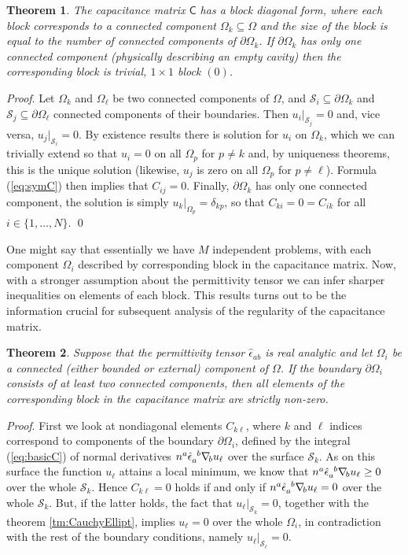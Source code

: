 \documentclass[12pt]{iopart}
\newcommand{\dd}{\partial}
\newcommand{\nab}[1]{\nabla_{\! #1}}
\newcommand{\mx}[1]{\bm{\mathsf{#1}}}
\newcommand{\0}{\vct{0}}
\theoremstyle{plain} \newtheorem{tm}{Theorem}[section]
\theoremstyle{plain} \newtheorem{lm}[tm]{Lemma}
\theoremstyle{definition} \newtheorem{defn}[tm]{Definition}
\newcommand{\btm}{\begin{tm}}
\newcommand{\etm}{\end{tm}}
\begin{document}
\btm
The capacitance matrix $\mx{C}$ has a block diagonal form, where each block corresponds to a connected component $\Omega_k \subseteq \Omega$ and the size of the block is equal to the number of connected components of $\dd\Omega_k$. If $\dd\Omega_k$ has only one connected component (physically describing an empty cavity) then the corresponding block is trivial, $1 \times 1$ block $(0)$.
\etm

\emph{Proof}. Let $\Omega_k$ and $\Omega_\ell$ be two connected components of $\Omega$, and $\mathcal{S}_i \subseteq \dd\Omega_k$ and $\mathcal{S}_j \subseteq \dd\Omega_\ell$ connected components of their boundaries. Then $u_i|_{\mathcal{S}_j} = 0$ and, vice versa, $u_j|_{\mathcal{S}_i} = 0$. By existence results there is solution for $u_i$ on $\Omega_k$, which we can trivially extend so that $u_i = 0$ on all $\Omega_p$ for $p \ne k$ and, by uniqueness theorems, this is the unique solution (likewise, $u_j$ is zero on all $\Omega_p$ for $p \ne \ell$). Formula (\ref{eq:symC}) then implies that $C_{ij} = 0$. Finally, $\dd\Omega_k$ has only one connected component, the solution is simply $u_k|_{\Omega_p} = \delta_{kp}$, so that $C_{ki} = 0 = C_{ik}$ for all $i \in \{1,\dots,N\}$. \qed

\medskip

One might say that essentially we have $M$ independent problems, with each component $\Omega_i$ described by corresponding block in the capacitance matrix. Now, with a stronger assumption about the permittivity tensor we can infer sharper inequalities on elements of each block. This results turns out to be the information crucial for subsequent analysis of the regularity of the capacitance matrix.

\medskip



\btm\label{tm:nonzeroC}
Suppose that the permittivity tensor $\hat{\epsilon}_{ab}$ is real analytic and let $\Omega_i$ be a connected (either bounded or external) component of $\Omega$. If the boundary $\dd\Omega_i$ consists of at least two connected components, then all elements of the corresponding block in the capacitance matrix are strictly non-zero.
\etm

\emph{Proof}. First we look at nondiagonal elements $C_{k\ell}$, where $k$ and $\ell$ indices correspond to components of the boundary $\dd\Omega_i$, defined by the integral (\ref{eq:basicC}) of normal derivatives $n^a \tensor{\hat{\epsilon}}{_a^b} \nab{b} u_\ell$ over the surface $\mathcal{S}_k$. As on this surface the function $u_\ell$ attains a local minimum, we know that $n^a \tensor{\hat{\epsilon}}{_a^b} \nab{b} u_\ell \ge 0$ over the whole $\mathcal{S}_k$. Hence $C_{k\ell} = 0$ holds if and only if $n^a \tensor{\hat{\epsilon}}{_a^b} \nab{b} u_\ell = 0$ over the whole $\mathcal{S}_k$. But, if the latter holds, the fact that $u_\ell|_{\mathcal{S}_k} = 0$, together with the theorem \ref{tm:CauchyEllipt}, implies $u_\ell = 0$ over the whole $\Omega_i$, in contradiction with the rest of the boundary conditions, namely $u_\ell|_{\mathcal{S}_\ell} = 0$.
\end{document}
